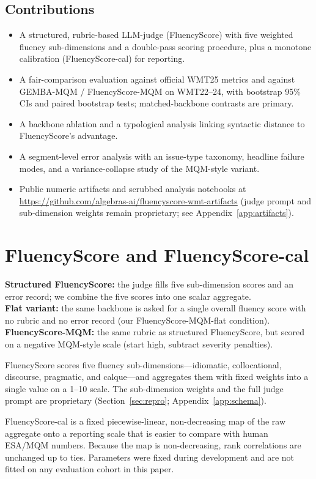 \documentclass[11pt]{article}
\newcommand{\FS}{FluencyScore}
\newcommand{\FSCal}{FluencyScore-cal}
\newcommand{\ArtifactsLink}{\url{https://github.com/algebras-ai/fluencyscore-wmt-artifacts}}
\begin{document}
\subsection{Contributions}
\begin{itemize}
\item A structured, rubric-based LLM-judge (\FS{}) with five weighted fluency
  sub-dimensions and a double-pass scoring procedure, plus a monotone
  calibration (\FSCal{}) for reporting.
\item A fair-comparison evaluation against official WMT25 metrics and against
  GEMBA-MQM / FluencyScore-MQM on WMT22--24, with bootstrap 95\% CIs and paired
  bootstrap tests; matched-backbone contrasts are primary.
\item A backbone ablation and a typological analysis linking syntactic distance
  to \FS{}'s advantage.
\item A segment-level error analysis with an issue-type taxonomy, headline
  failure modes, and a variance-collapse study of the MQM-style variant.
\item Public numeric artifacts and scrubbed analysis notebooks at
  \ArtifactsLink{} (judge prompt and sub-dimension weights remain proprietary;
  see Appendix~\ref{app:artifacts}).
\end{itemize}

\section{\FS{} and \FSCal{}}
\textbf{Structured \FS{}:} the judge fills five sub-dimension scores and an
error record; we combine the five scores into one scalar aggregate.\\
\textbf{Flat variant:} the same backbone is asked for a single overall fluency
score with no rubric and no error record (our FluencyScore-MQM-flat condition).\\
\textbf{FluencyScore-MQM:} the same rubric as structured \FS{}, but scored on a
negative MQM-style scale (start high, subtract severity penalties).

\FS{} scores five fluency sub-dimensions---idiomatic, collocational, discourse,
pragmatic, and calque---and aggregates them with fixed weights into a single
value on a 1--10 scale.
The sub-dimension weights and the full judge prompt are proprietary
(Section~\ref{sec:repro}; Appendix~\ref{app:schema}).

\FSCal{} is a fixed piecewise-linear, non-decreasing map of the raw aggregate onto
a reporting scale that is easier to compare with human ESA/MQM numbers.
Because the map is non-decreasing, rank correlations are unchanged up to ties.
Parameters were fixed during development and are not fitted on any evaluation
cohort in this paper.
\end{document}
